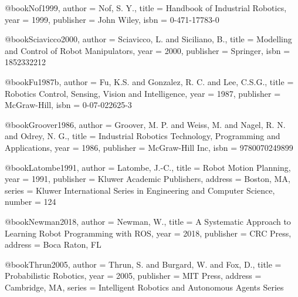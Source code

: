 @book{Nof1999,
  author = {Nof, S. Y.},
  title = {Handbook of Industrial Robotics},
  year = {1999},
  publisher = {John Wiley},
  isbn = {0-471-17783-0}
}

@book{Sciavicco2000,
  author = {Sciavicco, L. and Siciliano, B.},
  title = {Modelling and Control of Robot Manipulators},
  year = {2000},
  publisher = {Springer},
  isbn = {1852332212}
}

@book{Fu1987b,
  author = {Fu, K.S. and Gonzalez, R. C. and Lee, C.S.G.},
  title = {Robotics Control, Sensing, Vision and Intelligence},
  year = {1987},
  publisher = {McGraw-Hill},
  isbn = {0-07-022625-3}
}

@book{Groover1986,
  author = {Groover, M. P. and Weiss, M. and Nagel, R. N. and Odrey, N. G.},
  title = {Industrial Robotics Technology, Programming and Applications},
  year = {1986},
  publisher = {McGraw-Hill Inc},
  isbn = {9780070249899}
}

%

@book{Latombe1991,
  author = {Latombe, J.-C.},
  title = {Robot Motion Planning},
  year = {1991},
  publisher = {Kluwer Academic Publishers},
  address = {Boston, MA},
  series = {Kluwer International Series in Engineering and Computer Science},
  number = {124}
}

@book{Newman2018,
  author = {Newman, W.},
  title = {A Systematic Approach to Learning Robot Programming with ROS},
  year = {2018},
  publisher = {CRC Press},
  address = {Boca Raton, FL}
}

@book{Thrun2005,
  author = {Thrun, S. and Burgard, W. and Fox, D.},
  title = {Probabilistic Robotics},
  year = {2005},
  publisher = {MIT Press},
  address = {Cambridge, MA},
  series = {Intelligent Robotics and Autonomous Agents Series}
}

